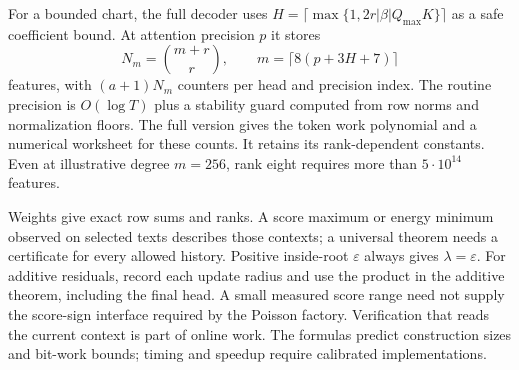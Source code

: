 For a bounded chart, the full decoder uses
$H=\lceil\max\{1,2r|\beta|Q_{\max}K\}\rceil$ as a safe coefficient bound.
At attention precision $p$ it stores
\[
 N_m=\binom{m+r}{r},\qquad m=\lceil8(p+3H+7)\rceil
\]
features, with $(a+1)N_m$ counters per head and precision index.
The routine precision is $O(\log T)$ plus a stability guard
computed from row norms and normalization floors.
The full version gives the token work polynomial and a numerical
worksheet for these counts. It retains its rank-dependent
constants. Even at illustrative degree $m=256$, rank eight
requires more than $5\cdot10^{14}$ features.

Weights give exact row sums and ranks. A score maximum or energy
minimum observed on selected texts describes those contexts;
a universal theorem needs a certificate for every allowed
history. Positive inside-root $\varepsilon$ always gives
$\lambda=\varepsilon$. For additive residuals, record each update
radius and use the product in the additive theorem, including
the final head. A small measured score range need not supply
the score-sign interface required by the Poisson factory.
Verification that reads the current context is part of online
work. The formulas predict construction sizes and bit-work
bounds; timing and speedup require calibrated implementations.

